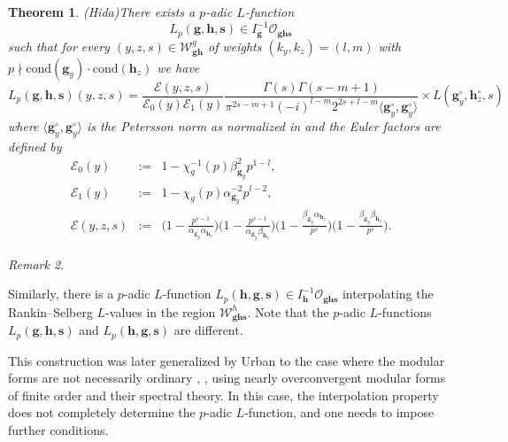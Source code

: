 \documentclass[a4paper,11pt]{amsart}
\theoremstyle{plain}
\newtheorem{theorem}{Theorem}[section]
\theoremstyle{definition}
\theoremstyle{remark}
\newtheorem{remarkwr}[theorem]{Remark}
\newenvironment{remark}{\begin{remarkwr}\begin{upshape}}{\end{upshape}\end{remarkwr}}
\newcommand{\cl}{\mathcal}
\newcommand{\hg}{{\mathbf{g}}}
\newcommand{\hh}{{\mathbf h}}
\numberwithin{equation}{section}
\begin{document}
\begin{theorem}(Hida)\label{thm:Hida-3var}
There exists a $p$-adic $L$-function
\[
L_p(\hg,\hh,\mathbf{s}) \in I_{\hg}^{-1}\cl{O}_{\hg \hh \mathbf{s}}
\]
such that for every $(y,z,s)\in\mathcal W_{\hg \hh}^g$ of weights $(k_y,k_z)=(l,m)$ with $p\nmid \mathrm{cond}(\hg_y)\cdot \mathrm{cond}(\hh_z)$ we have
\[
L_p(\hg,\hh,\mathbf{s})(y,z,s) = \frac{\mathcal{E}(y,z,s)}{\mathcal{E}_0(y)\mathcal{E}_1(y)} \frac{\Gamma(s)\Gamma(s-m+1)}{\pi^{2s-m+1}(-i)^{l-m}2^{2s+l-m} \langle \hg_y^\circ,\hg_y^\circ \rangle}  \times L(\hg_y^\circ,\hh_z^\circ,s)
\]
where $\langle \hg_y^{\circ}, \hg_y^{\circ} \rangle$ is the Petersson norm as normalized in \cite{KLZ} and the Euler factors are defined by
\begin{eqnarray}
      \nonumber \mathcal E_0(y) &:=& 1-\chi_g^{-1}(p) \beta_{\hg_y}^2p^{1-l}, \\
      \nonumber \mathcal E_1(y) &:=& 1-\chi_g(p)\alpha_{\hg_y}^{-2}p^{l-2}, \\
      \mathcal E(y,z,s) &:=& \Big(1-\frac{p^{s-1}}{\alpha_{\hg_y} \alpha_{\hh_z}} \Big) \Big(1-\frac{p^{s-1}}{\alpha_{\hg_y} \beta_{\hh_z}} \Big) \Big(1-\frac{\beta_{\hg_y} \alpha_{\hh_z}}{p^{s}}\Big) \Big(1-\frac{\beta_{\hg_y} \beta_{\hh_z}}{p^{s}}\Big).
\end{eqnarray}
\end{theorem}

\begin{remark}
Similarly, there is a $p$-adic $L$-function $L_p(\hh,\hg,\mathbf{s}) \in I_{\hh}^{-1}\cl{O}_{\hg \hh \mathbf{s}}$ interpolating the Rankin--Selberg $L$-values in the region $\cl{W}_{\hg\hh\mathbf{s}}^h$. Note that the $p$-adic $L$-functions $L_p(\hg,\hh,\mathbf{s})$ and $L_p(\hh,\hg,\mathbf{s})$ are different. %
\end{remark}

This construction was later generalized by Urban to the case where the modular forms are not necessarily ordinary \cite{Urban-nearly-overconvergent}, \cite[App.]{AI}, using nearly overconvergent modular forms of finite order and their spectral theory. In this case, the interpolation property does not completely determine the $p$-adic $L$-function, and one needs to impose further conditions.
\end{document}
